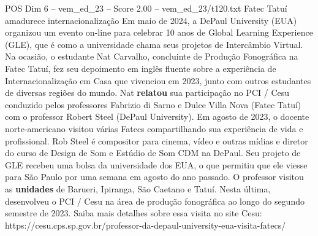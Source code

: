 \begin{textsample}{POS Dim 6 – vem\_ed\_23 – Score 2.00 – vem\_ed\_23/t120.txt}  \label{ex:f6_pos_127}
Fatec Tatuí amadurece internacionalização Em maio de 2024, a DePaul University (EUA) organizou um evento on-line para celebrar 10 anos de Global Learning Experience (GLE), que é como a universidade chama seus projetos de Intercâmbio Virtual.
Na ocasião, o estudante Nat Carvalho, concluinte de Produção Fonográfica na Fatec Tatuí, fez seu depoimento em inglês fluente sobre a experiência de Internacionalização em Casa que vivenciou em 2023, junto com outros estudantes de diversas regiões do mundo.
Nat \textbf{relatou} sua participação no PCI / Cesu conduzido pelos professores Fabrizio di Sarno e Dulce Villa Nova (Fatec Tatuí) com o professor Robert Steel (DePaul University).
Em agosto de 2023, o docente norte-americano visitou várias Fatecs compartilhando sua experiência de vida e profissional.
Rob Steel é compositor para cinema, vídeo e outras mídias e diretor do curso de Design de Som e Estúdio de Som CDM na DePaul.
Seu projeto de GLE recebeu uma bolsa da universidade dos EUA, o que permitiu que ele viesse para São Paulo por uma semana em agosto do ano passado.
O professor visitou as \textbf{unidades} de Barueri, Ipiranga, São Caetano e Tatuí.
Nesta última, desenvolveu o PCI / Cesu na área de produção fonográfica ao longo do segundo semestre de 2023.
Saiba mais detalhes sobre essa visita no site Cesu: https://cesu.cps.sp.gov.br/professor-da-depaul-university-eua-visita-fatecs/

\end{textsample}
